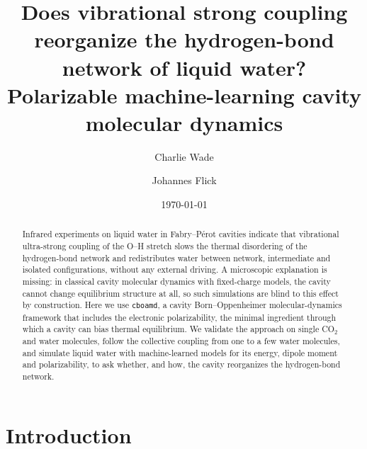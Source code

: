 \documentclass[aps,prb,reprint,superscriptaddress,nofootinbib,floatfix]{revtex4-2}
\begin{document}
\title{Does vibrational strong coupling reorganize the hydrogen-bond network of liquid
water? Polarizable machine-learning cavity molecular dynamics}

\author{Charlie Wade}
\author{Johannes Flick}

\date{\today}

\begin{abstract}
Infrared experiments on liquid water in Fabry--P\'erot cavities indicate that
vibrational ultra-strong coupling of the O--H stretch slows the thermal disordering of
the hydrogen-bond network and redistributes water between network, intermediate and
isolated configurations, without any external driving. A microscopic explanation is
missing: in classical cavity molecular dynamics with fixed-charge models, the cavity
cannot change equilibrium structure at all, so such simulations are blind to this
effect by construction. Here we use \texttt{cboamd}, a cavity Born--Oppenheimer
molecular-dynamics framework that includes the electronic polarizability, the minimal
ingredient through which a cavity can bias thermal equilibrium. We validate the approach
on single CO$_2$ and water molecules, follow the collective coupling from one to a few
water molecules, and simulate liquid water with machine-learned models for its energy,
dipole moment and polarizability, to ask whether, and how, the cavity reorganizes the
hydrogen-bond network.
\end{abstract}

\maketitle

\section{Introduction}
\end{document}
